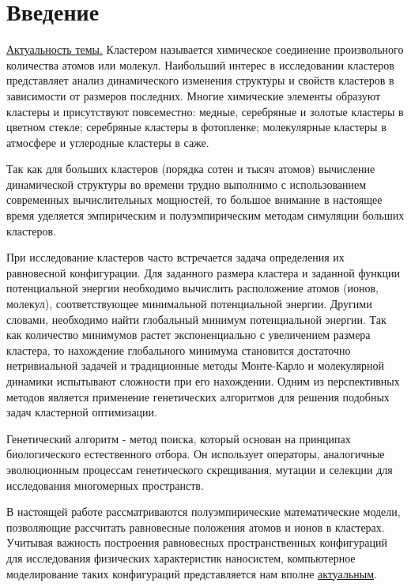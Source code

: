 \newpage


\section*{Введение}



\underline{\noindent Актуальность темы.} Кластером называется химическое
соединение произвольного количества атомов или молекул.  Наибольший интерес в
исследовании кластеров представляет анализ динамического изменения структуры и
свойств кластеров в зависимости от размеров последних.  Многие химические
элементы образуют кластеры и присутствуют повсеместно: медные, серебряные и
золотые кластеры в цветном стекле; серебряные кластеры в фотопленке;
молекулярные кластеры в атмосфере и углеродные кластеры в саже.

Так как для больших кластеров (порядка сотен и тысяч атомов) вычисление
динамической структуры во времени трудно выполнимо с
использованием современных вычислительных мощностей, то большое внимание
в настоящее время уделяется эмпирическим и полуэмпирическим методам симуляции больших кластеров.

При исследование кластеров часто встречается задача определения их равновесной
конфигурации.  Для заданного размера кластера и заданной функции потенциальной
энергии необходимо вычислить расположение атомов (ионов, молекул),
соответствующее минимальной потенциальной энергии. Другими словами, необходимо
найти глобальный минимум потенциальной энергии. Так как количество минимумов
растет экспоненциально с увеличением размера кластера, то нахождение
глобального минимума становится достаточно нетривиальной задачей и традиционные
методы Монте-Карло и молекулярной динамики испытывают сложности при его
нахождении. Одним из перспективных методов является применение генетических
алгоритмов для решения подобных задач кластерной оптимизации.

Генетический алгоритм - метод поиска, который основан на принципах биологического
естественного отбора. Он использует операторы, аналогичные эволюционным процессам генетического
скрещивания, мутации и селекции для исследования многомерных пространств.

В настоящей работе рассматриваются полуэмпирические математические модели, позволяющие рассчитать
равновесные положения атомов и ионов в кластерах. Учитывая важность построения равновесных пространственных
конфигураций для исследования физических характеристик наносистем, компьютерное моделирование таких конфигураций
представляется нам вполне \underline{актуальным}.

